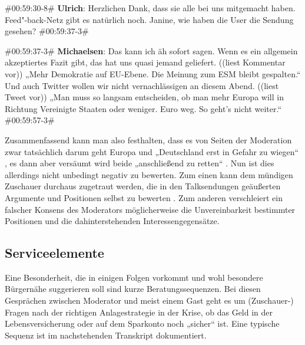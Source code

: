 \begin{description}
	\begin{linenumbers}[1]
		\item \#00:59:30-8\# \textbf{Ulrich}: Herzlichen Dank, dass sie alle bei uns mitgemacht haben. Feed"-back-Netz gibt es natürlich noch. Janine, wie haben die User die Sendung gesehen? \#00:59:37-3\#
		
		\item \#00:59:37-3\# \textbf{Michaelsen}: Das kann ich äh sofort sagen. Wenn es ein allgemein akzeptiertes Fazit gibt, das hat uns quasi jemand geliefert. ((liest Kommentar vor))  „Mehr Demokratie auf EU-Ebene. Die Meinung zum ESM bleibt gespalten.“ Und auch Twitter wollen wir nicht vernachlässigen an diesem Abend. ((liest Tweet vor)) „Man muss so langsam entscheiden, ob man mehr Europa will in Richtung Vereinigte Staaten oder weniger. Euro weg. So geht's nicht weiter.“ \#00:59:57-3\#
	\end{linenumbers}
\end{description}

Zusammenfassend kann man also festhalten, dass es von Seiten der Moderation zwar tatsächlich darum geht Europa und „Deutschland erst in Gefahr zu wiegen“ \parencite[17]{rossumMeineSonntageMit2004}, es dann aber versäumt wird beide „anschließend zu retten“ \parencite[17]{rossumMeineSonntageMit2004}. Nun ist dies allerdings nicht unbedingt negativ zu bewerten. Zum einen kann dem mündigen Zuschauer durchaus zugetraut werden, die in den Talksendungen geäußerten Argumente und Positionen selbst zu bewerten \parencite[18]{tolsonTalkingTalkAcademic2001}. Zum anderen verschleiert ein falscher Konsens des Moderators möglicherweise die Unvereinbarkeit bestimmter Positionen und die dahinterstehenden Interessengegensätze.

\subsection{Serviceelemente}

Eine Besonderheit, die in einigen Folgen vorkommt und wohl besondere Bürgernähe suggerieren soll sind kurze Beratungssequenzen. Bei diesen Gesprächen zwischen Moderator und meist einem Gast geht es um (Zuschauer-) Fragen nach der richtigen Anlagestrategie in der Krise, ob das Geld in der Lebensversicherung oder auf dem Sparkonto noch „sicher“ ist. Eine typische Sequenz ist im nachstehenden Transkript dokumentiert.

